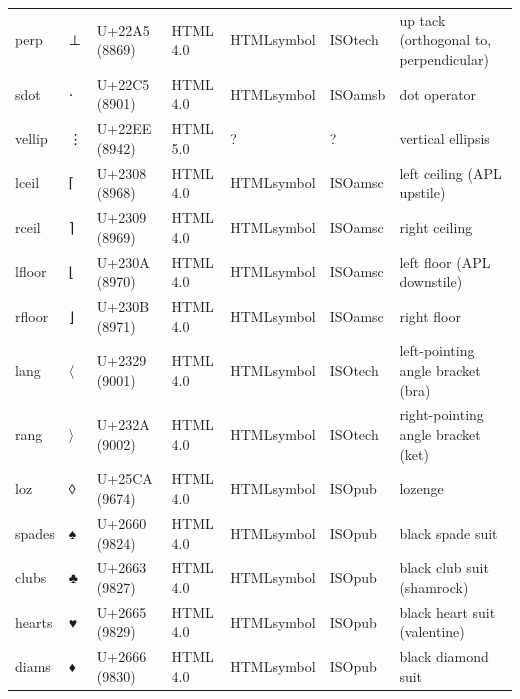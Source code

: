 \documentclass{article}
\begin{document}
\begin{tabular}{lllllll}
perp & ⊥ & U+22A5 (8869) & HTML 4.0 & HTMLsymbol & ISOtech & up tack (orthogonal to, perpendicular) \\
sdot & ⋅ & U+22C5 (8901) & HTML 4.0 & HTMLsymbol & ISOamsb & dot operator \\
vellip & ⋮ & U+22EE (8942) & HTML 5.0 & ? & ? & vertical ellipsis \\
lceil & ⌈ & U+2308 (8968) & HTML 4.0 & HTMLsymbol & ISOamsc & left ceiling (APL upstile) \\
rceil & ⌉ & U+2309 (8969) & HTML 4.0 & HTMLsymbol & ISOamsc & right ceiling \\
lfloor & ⌊ & U+230A (8970) & HTML 4.0 & HTMLsymbol & ISOamsc & left floor (APL downstile) \\
rfloor & ⌋ & U+230B (8971) & HTML 4.0 & HTMLsymbol & ISOamsc & right floor \\
lang & 〈 & U+2329 (9001) & HTML 4.0 & HTMLsymbol & ISOtech & left-pointing angle bracket (bra) \\
rang & 〉 & U+232A (9002) & HTML 4.0 & HTMLsymbol & ISOtech & right-pointing angle bracket (ket) \\
loz & ◊ & U+25CA (9674) & HTML 4.0 & HTMLsymbol & ISOpub & lozenge \\
spades & ♠ & U+2660 (9824) & HTML 4.0 & HTMLsymbol & ISOpub & black spade suit \\
clubs & ♣ & U+2663 (9827) & HTML 4.0 & HTMLsymbol & ISOpub & black club suit (shamrock) \\
hearts & ♥ & U+2665 (9829) & HTML 4.0 & HTMLsymbol & ISOpub & black heart suit (valentine) \\
diams & ♦ & U+2666 (9830) & HTML 4.0 & HTMLsymbol & ISOpub & black diamond suit \\
\bottomrule
\end{tabular}
\end{document}
